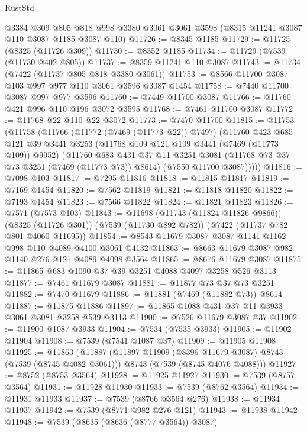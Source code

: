\begin{lexlean}{RustStd}
\begin{coremodule}
    @3384
    @309
    @805
    @818
    @998
    @3380
    @3061
    @3061
    @3598
    (@8315 @11241 @3087 @110 @3087 @1185 @3087 @110)
@11726 := @8345 @1185
@11729 := @11725 (@8325 (@11726 @309))
@11730 := @8352 @1185
@11734 := @11729 (@7539 (@11730 @402 @805))
@11737 := @8359 @11241 @110 @3087
@11743 := @11734 (@7422 (@11737 @805 @818 @3380 @3061))
@11753 := @8566 @11700 @3087 @103 @997 @977 @110 @3061 @3596 @3087 @1454
@11758 := @7440 @11700 @3087 @997 @977 @3596
@11760 := @7449 @11700 @3087
@11766 := @11760 @421 @996 @110 @196 @3072 @3595
@11768 := @7461 @11700 @3087
@11772 := @11768 @22 @110 @22 @3072
@11773 := @7470 @11700
@11815 := @11753
    (@11758
      (@11766
        (@11772 (@7469 (@11773 @22)) @7497)
        (@11760
          @423
          @685
          @121
          @39
          @3441
          @3253
          (@11768 @109 @121 @109 @3441 (@7469 (@11773 @109)) @9952)
          (@11760
            @683
            @431
            @37
            @11
            @3251
            @3081
            (@11768 @73 @37 @73 @3251 (@7469 (@11773 @73)) @8614)
            (@7550 @11700 @3087)))))
@11816 := @7098 @103
@11817 := @7295 @11816
@11818 := @11815 @11817
@11819 := @7169 @1454
@11820 := @7562 @11819
@11821 := @11818 @11820
@11822 := @7193 @1454
@11823 := @7566 @11822
@11824 := @11821 @11823
@11826 := @7571 (@7573 @103)
@11843 := @11698
    (@11743 (@11824 @11826 @9866))
    (@8325 (@11726 @301))
    (@7539 (@11730 @892 @782))
    (@7422 (@11737 @782 @801 @4060 @11695))
@11854 := @8543 @11679 @3087 @3087 @1141 @1162 @998 @110 @4089 @4100 @3061 @4132
@11863 := @8663 @11679 @3087 @982 @1140 @276 @121 @4089 @4098 @3564
@11865 := @8676 @11679 @3087
@11875 := @11865 @683 @1090 @37 @39 @3251 @4088 @4097 @3258 @526 @3113
@11877 := @7461 @11679 @3087
@11881 := @11877 @73 @37 @73 @3251
@11882 := @7470 @11679
@11886 := @11881 (@7469 (@11882 @73)) @8614
@11887 := @11875 @11886
@11897 := @11865 @1088 @431 @37 @11 @3933 @3061 @3081 @3258 @539 @3113
@11900 := @7526 @11679 @3087 @37
@11902 := @11900 @1087 @3933
@11904 := @7534 (@7535 @3933)
@11905 := @11902 @11904
@11908 := @7539 (@7541 @1087 @37)
@11909 := @11905 @11908
@11925 := @11863
    (@11887
      (@11897 @11909 (@8396 @11679 @3087) @8743 (@7539 (@8745 @4082 @3061)))
      @8743
      (@7539 (@8745 @4076 @4088)))
@11927 := @8752 (@8753 @3564)
@11928 := @11925 @11927
@11930 := @7539 (@8757 @3564)
@11931 := @11928 @11930
@11933 := @7539 (@8762 @3564)
@11934 := @11931 @11933
@11937 := @7539 (@8766 @3564 @276)
@11938 := @11934 @11937
@11942 := @7539 (@8771 @982 @276 @121)
@11943 := @11938 @11942
@11948 := @7539 (@8635 (@8636 (@8777 @3564)) @3087)

\end{coremodule}
\end{lexlean}
